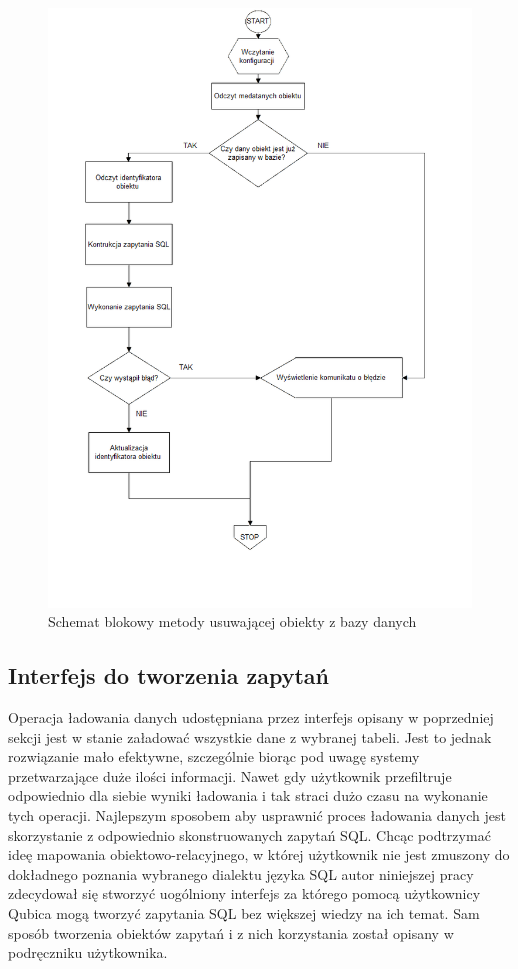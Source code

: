 \documentclass[12pt]{report}
\begin{document}
\begin{figure}[H]
\centering
\includegraphics[width=\textwidth]{resources/remove_schema.png}
\caption{Schemat blokowy metody usuwającej obiekty z bazy danych}
\label{blok4}
\end{figure}

\newpage

\subsection{Interfejs do tworzenia zapytań}

Operacja ładowania danych udostępniana przez interfejs opisany w poprzedniej sekcji jest w stanie załadować wszystkie dane z wybranej tabeli. Jest to jednak rozwiązanie
mało efektywne, szczególnie biorąc pod uwagę systemy przetwarzające duże ilości informacji. Nawet gdy użytkownik przefiltruje odpowiednio dla siebie wyniki ładowania i tak
straci dużo czasu na wykonanie tych operacji. Najlepszym sposobem aby usprawnić proces ładowania danych jest skorzystanie z odpowiednio skonstruowanych zapytań SQL.
Chcąc podtrzymać ideę mapowania obiektowo-relacyjnego, w której użytkownik nie jest zmuszony do dokładnego poznania wybranego dialektu języka SQL autor niniejszej
pracy zdecydował się stworzyć uogólniony interfejs za którego pomocą użytkownicy Qubica mogą tworzyć zapytania SQL bez większej wiedzy na ich temat. Sam sposób tworzenia
obiektów zapytań i z nich korzystania został opisany w podręczniku użytkownika.
\end{document}
